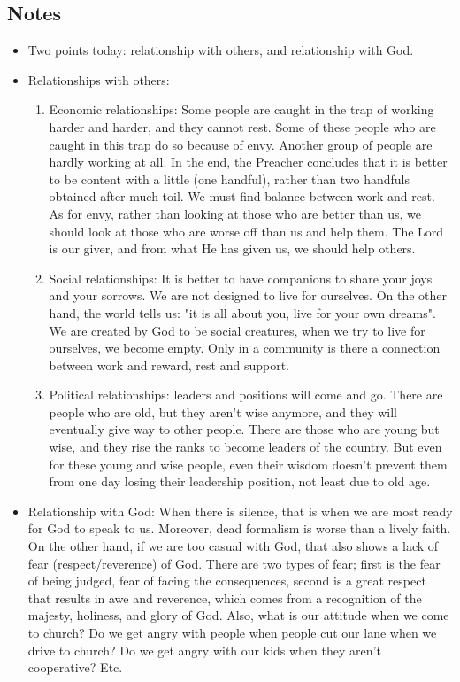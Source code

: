\subsection*{Notes}
\begin{itemize}
  \item{Two points today: relationship with others, and relationship with God.}
  \item{Relationships with others: 
  \begin{enumerate}
    \item{Economic relationships: Some people are caught in the trap of
    working harder and harder, and they cannot rest.  Some of these people
    who are caught in this trap do so because of envy.  Another group of
    people are hardly working at all.  In the end, the Preacher concludes
    that it is better to be content with a little (one handful), rather than
    two handfuls obtained after much toil.  We must find balance between work
    and rest.  As for envy, rather than looking at those who are better than
    us, we should look at those who are worse off than us and help them.  The
    Lord is our giver, and from what He has given us, we should help others.}
    \item{Social relationships: It is better to have companions to share your
    joys and your sorrows.  We are not designed to live for ourselves.  On
    the other hand, the world tells us: "it is all about you, live for your
    own dreams".  We are created by God to be social creatures, when we try
    to live for ourselves, we become empty.  Only in a community is there a
    connection between work and reward, rest and support.}
    \item{Political relationships: leaders and positions will come and go.
    There are people who are old, but they aren't wise anymore, and they will
    eventually give way to other people.  There are those who are young but
    wise, and they rise the ranks to become leaders of the country.  But even
    for these young and wise people, even their wisdom doesn't prevent them
    from one day losing their leadership position, not least due to old age.
    }
  \end{enumerate}}
  \item{Relationship with God: When there is silence, that is when we are
  most ready for God to speak to us.  Moreover, dead formalism is worse than
  a lively faith.  On the other hand, if we are too casual with God, that
  also shows a lack of fear (respect/reverence) of God.  There are two types
  of fear; first is the fear of being judged, fear of facing the
  consequences, second is a great respect that results in awe and reverence,
  which comes from a recognition of the majesty, holiness, and glory of God.
  Also, what is our attitude when we come to church?  Do we get angry with
  people when people cut our lane when we drive to church?  Do we get angry
  with our kids when they aren't cooperative?  Etc.
  
}
\end{itemize}
